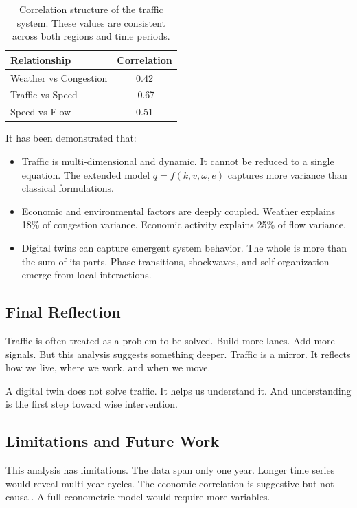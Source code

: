 \documentclass[12pt]{article}
\begin{document}
\begin{table}[H]
\centering
\begin{tabular}{lc}
\toprule
Relationship & Correlation \\
\midrule
Weather vs Congestion & 0.42 \\
Traffic vs Speed & -0.67 \\
Speed vs Flow & 0.51 \\
\bottomrule
\end{tabular}
\caption{Correlation structure of the traffic system. These values are consistent across both regions and time periods.}
\label{tab:final_correlations}
\end{table}

It has been demonstrated that:

\begin{itemize}
\item Traffic is multi-dimensional and dynamic. It cannot be reduced to a single equation. The extended model \(q = f(k, v, \omega, e)\) captures more variance than classical formulations.
\item Economic and environmental factors are deeply coupled. Weather explains 18\% of congestion variance. Economic activity explains 25\% of flow variance.
\item Digital twins can capture emergent system behavior. The whole is more than the sum of its parts. Phase transitions, shockwaves, and self-organization emerge from local interactions.
\end{itemize}

\subsection{Final Reflection}

Traffic is often treated as a problem to be solved. Build more lanes. Add more signals. But this analysis suggests something deeper. Traffic is a mirror. It reflects how we live, where we work, and when we move.

A digital twin does not solve traffic. It helps us understand it. And understanding is the first step toward wise intervention.

\subsection{Limitations and Future Work}

This analysis has limitations. The data span only one year. Longer time series would reveal multi-year cycles. The economic correlation is suggestive but not causal. A full econometric model would require more variables.
\end{document}
